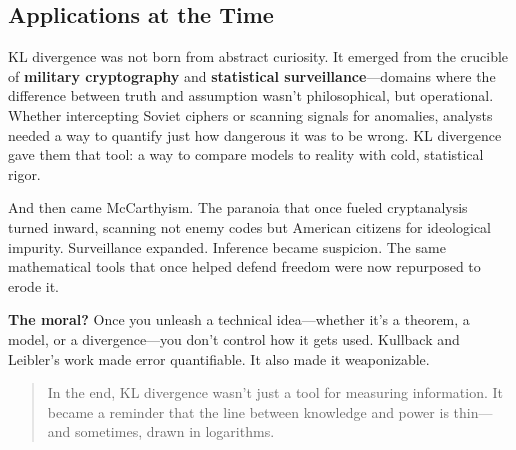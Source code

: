 \subsection{Applications at the Time}

KL divergence was not born from abstract curiosity. It emerged from the crucible of \textbf{military cryptography} and \textbf{statistical surveillance}—domains where the difference between truth and assumption wasn’t philosophical, but operational. Whether intercepting Soviet ciphers or scanning signals for anomalies, analysts needed a way to quantify just how dangerous it was to be wrong. KL divergence gave them that tool: a way to compare models to reality with cold, statistical rigor.

And then came McCarthyism. The paranoia that once fueled cryptanalysis turned inward, scanning not enemy codes but American citizens for ideological impurity. Surveillance expanded. Inference became suspicion. The same mathematical tools that once helped defend freedom were now repurposed to erode it.

\medskip

\noindent\textbf{The moral?} Once you unleash a technical idea—whether it’s a theorem, a model, or a divergence—you don’t control how it gets used. Kullback and Leibler’s work made error quantifiable. It also made it weaponizable.

\begin{quote}
In the end, KL divergence wasn’t just a tool for measuring information. It became a reminder that the line between knowledge and power is thin—  
and sometimes, drawn in logarithms.
\end{quote}





